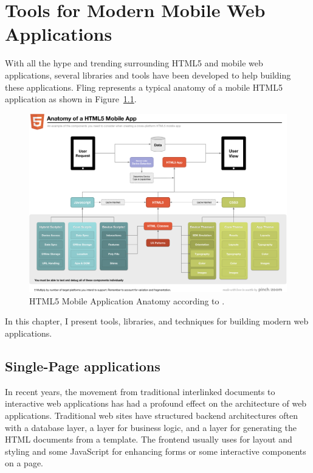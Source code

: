 \chapter{Tools for Modern Mobile Web Applications}
\label{chapter:tools-and-techniques}

With all the hype and trending surrounding HTML5 and mobile web
applications, several libraries and tools have been developed to help
building these applications. Fling \cite{fling2011anatomy} represents
a typical anatomy of a mobile HTML5 application as shown in
Figure~\ref{figure:anatomy-of-a-html5-mobile-app.png}.

\begin{figure}[ht]
  \includegraphics[width=\textwidth]{images/anatomy-of-a-html5-mobile-app.png}
  \caption{HTML5 Mobile Application Anatomy according to
    \cite{fling2011anatomy}.}
  \label{figure:anatomy-of-a-html5-mobile-app.png}
\end{figure}

In this chapter, I present tools, libraries, and techniques for
building modern web applications.

\section{Single-Page applications}
\label{section:single-page-applications}

In recent years, the movement from traditional interlinked documents
to interactive web applications has had a profound effect on the
architecture of web applications. Traditional web sites have
structured backend architectures often with a database layer, a layer
for business logic, and a layer for generating the HTML documents from
a template. The frontend usually uses  for layout and
styling and some JavaScript for enhancing forms or some interactive
components on a page.

